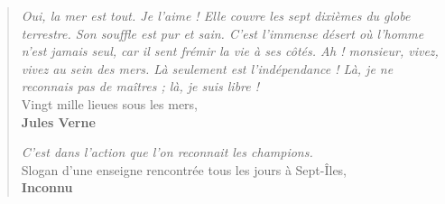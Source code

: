 \thispagestyle{empty}

\begin{minipage}[l]{0.45\textwidth}

\end{minipage}%
\hfill
\begin{minipage}[r]{0.5\textwidth}
\begin{quotation}
\begin{doublespace}

\guillemotleft \textit{Oui, la mer est tout. Je l'aime ! Elle couvre les sept dixièmes du globe terrestre. Son souffle est pur et sain. C'est l'immense désert où l'homme n'est jamais seul, car il sent frémir la vie à ses côtés. Ah ! monsieur, vivez, vivez au sein des mers. Là seulement est l'indépendance ! Là, je ne reconnais pas de maîtres ; là, je suis libre !} \guillemotright \\
Vingt mille lieues sous les mers, \\
\textbf{Jules Verne}

\vspace{15mm}

\guillemotleft \textit{ C'est dans l'action que l'on reconnait les champions.} \guillemotright \\
Slogan d'une enseigne rencontrée tous les jours à Sept-Îles, \\
\textbf{Inconnu}

\end{doublespace}
\end{quotation}
\end{minipage}%

\cleardoublepage
